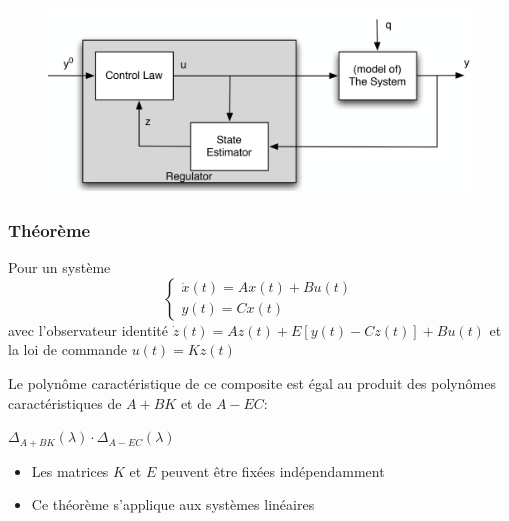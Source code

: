 \documentclass[resume]{subfiles}
\begin{document}
\begin{figure}[H]
    \centering
    \includegraphics[width=1\columnwidth]{Figures/CtrlStab_2.png}
\end{figure}

\subsubsection{Théorème}

 Pour un système \begin{equation}\begin{cases}\dot{x}(t)=Ax(t)+Bu(t)\\y(t)=Cx(t)\end{cases}\end{equation} avec l'observateur identité $\dot{z}(t)= Az(t)+E[y(t)-Cz(t)]+Bu(t)$ et la loi de commande $u(t)=Kz(t)$ 

Le polynôme caractéristique de ce composite est égal au produit des
polynômes caractéristiques de $A+BK$ et de $A-EC$:  

$\Delta_{A+BK}(\lambda)\cdot \Delta_{A-EC}(\lambda)$  
\begin{itemize}
\item Les matrices $K$ et $E$ peuvent être fixées indépendamment
\item Ce théorème s'applique aux systèmes linéaires  
\end{itemize}
\end{document}

